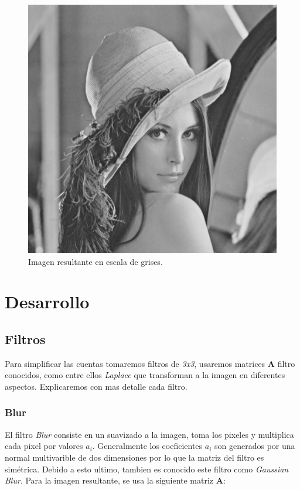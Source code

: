 \begin{figure}[H]
	\centering
	\includegraphics[scale=0.5]{imagenes/original.png}
	\caption{Imagen resultante en escala de grises\label{fig:lenna}.}
\end{figure}

\section{Desarrollo}

\subsection{Filtros}

Para simplificar las cuentas tomaremos filtros de \textit{3x3}, usaremos matrices \textbf{A} filtro conocidos, como entre ellos \textit{Laplace} que transforman a la imagen en diferentes aspectos. Explicaremos con mas detalle cada filtro.

\subsubsection{Blur}

El filtro \textit{Blur} consiste en un suavizado a la imagen, toma los pixeles y multiplica cada pixel por valores $a_i$. Generalmente los coeficientes $a_i$ son generados por una normal multivarible de dos dimensiones por lo que la matriz del filtro es simétrica. Debido a esto ultimo, tambien es conocido este filtro como \textit{Gaussian Blur}.
Para la imagen resultante, se usa la siguiente matriz \textbf{A}:

